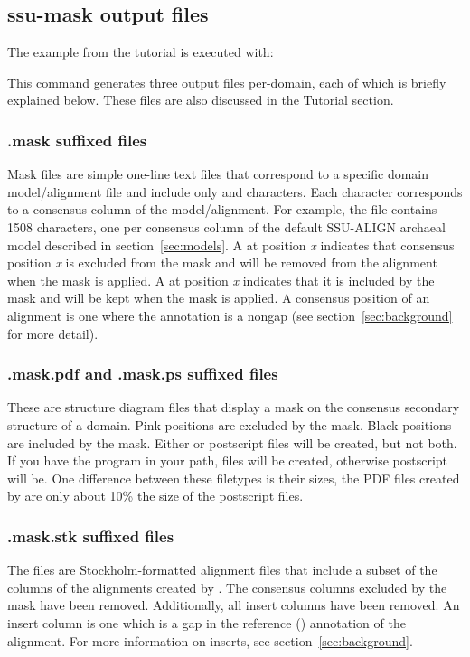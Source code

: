 \subsection{ssu-mask output files}

The  example from the tutorial is executed with:


This command generates three output files per-domain, each of which is
briefly explained below. These files are also discussed in the
Tutorial section. 

\subsubsection{.mask suffixed files}
Mask files are simple one-line text files that correspond to a
specific domain model/alignment file and include only  and
 characters. Each character corresponds to a consensus column
of the model/alignment. For example, the
 file contains 1508 characters, one per
consensus column of the default SSU-ALIGN archaeal model
described in section~\ref{sec:models}. A  at position \emph{x}
indicates that consensus position \emph{x} is excluded from the mask
and will be removed from the alignment when the mask is applied. A
 at position \emph{x} indicates that it is included by the
mask and will be kept when the mask is applied. A consensus position
of an alignment is one where the  annotation is a
nongap (see section~\ref{sec:background} for more detail).

\subsubsection{.mask.pdf and .mask.ps suffixed files}
These are structure diagram files that display a mask on the consensus
secondary structure of a domain. Pink positions are excluded by the
mask. Black positions are included by the mask. Either  or
postscript  files will be created, but not both. If you have
the program  in your path,  files will be
created, otherwise postscript will be. One difference between
these filetypes is their sizes, the PDF files created by
 are only about 10\% the size of the postscript files.

\subsubsection{.mask.stk suffixed files}
The  files are Stockholm-formatted alignment files
that include a subset of the columns of the alignments created by
. The consensus columns excluded by the mask have been
removed. Additionally, all insert columns have been removed. An insert
column is one which is a gap in the reference ()
annotation of the alignment. For more information on inserts, see
section~\ref{sec:background}.

